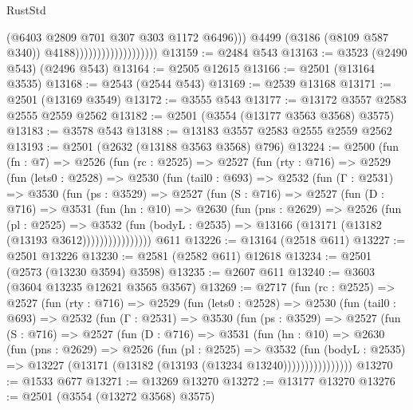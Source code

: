 \begin{lexlean}{RustStd}
\begin{coremodule}
                                              (@6403 @2809 @701 @307 @303 @1172 @6496)))
                                          @4499
                                          (@3186 (@8109 @587 @340))
                                          @4188)))))))))))))))))))
@13159 := @2484 @543
@13163 := @3523 (@2490 @543) (@2496 @543)
@13164 := @2505 @12615
@13166 := @2501 (@13164 @3535)
@13168 := @2543 (@2544 @543)
@13169 := @2539 @13168
@13171 := @2501 (@13169 @3549)
@13172 := @3555 @543
@13177 := @13172 @3557 @2583 @2555 @2559 @2562
@13182 := @2501 (@3554 (@13177 @3563 @3568) @3575)
@13183 := @3578 @543
@13188 := @13183 @3557 @2583 @2555 @2559 @2562
@13193 := @2501 (@2632 (@13188 @3563 @3568) @796)
@13224 := @2500
    (fun (fn : @7) =>
    @2526
      (fun (rc : @2525) =>
      @2527
        (fun (rty : @716) =>
        @2529
          (fun (lets0 : @2528) =>
          @2530
            (fun (tail0 : @693) =>
            @2532
              (fun (Γ : @2531) =>
              @3530
                (fun (ps : @3529) =>
                @2527
                  (fun (S : @716) =>
                  @2527
                    (fun (D : @716) =>
                    @3531
                      (fun (hn : @10) =>
                      @2630
                        (fun (pns : @2629) =>
                        @2526
                          (fun (pl : @2525) =>
                          @3532
                            (fun (bodyL : @2535) =>
                            @13166 (@13171 (@13182 (@13193 @3612))))))))))))))))
    @611
@13226 := @13164 (@2518 @611)
@13227 := @2501 @13226
@13230 := @2581 (@2582 @611) @12618
@13234 := @2501 (@2573 (@13230 @3594) @3598)
@13235 := @2607 @611
@13240 := @3603 (@3604 @13235 @12621 @3565 @3567)
@13269 := @2717
    (fun (rc : @2525) =>
    @2527
      (fun (rty : @716) =>
      @2529
        (fun (lets0 : @2528) =>
        @2530
          (fun (tail0 : @693) =>
          @2532
            (fun (Γ : @2531) =>
            @3530
              (fun (ps : @3529) =>
              @2527
                (fun (S : @716) =>
                @2527
                  (fun (D : @716) =>
                  @3531
                    (fun (hn : @10) =>
                    @2630
                      (fun (pns : @2629) =>
                      @2526
                        (fun (pl : @2525) =>
                        @3532
                          (fun (bodyL : @2535) =>
                          @13227 (@13171 (@13182 (@13193 (@13234 @13240))))))))))))))))
@13270 := @1533 @677
@13271 := @13269 @13270
@13272 := @13177 @13270
@13276 := @2501 (@3554 (@13272 @3568) @3575)

\end{coremodule}
\end{lexlean}
